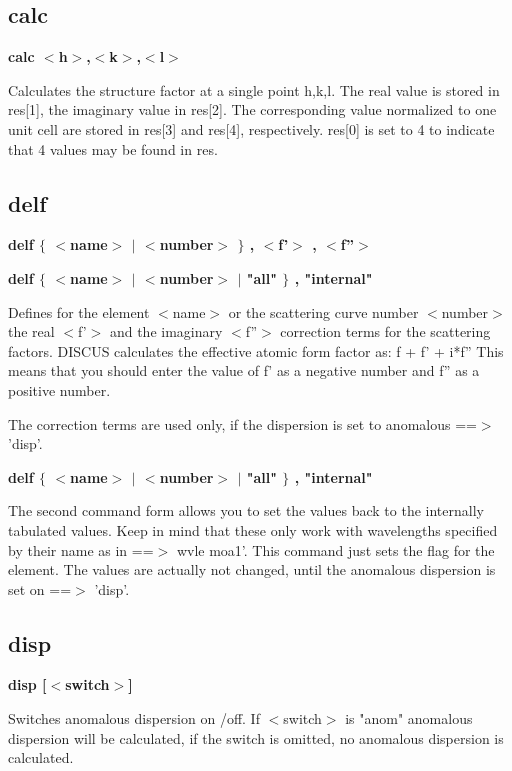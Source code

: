 \subsection*{calc}
{\bf calc $ <$h$> $,$ <$k$> $,$ <$l$> $ \par }
\vspace{3pt}
Calculates the structure factor at a single point h,k,l. 
The real value is stored in res[1], the imaginary value in res[2]. 
The corresponding value normalized to one unit cell are stored in 
res[3] and res[4], respectively. res[0] is set to 4 to indicate 
that 4 values may be found in res. 
\subsection*{delf}
{\bf delf $ \{$ $ <$name$> $ $| $ $ <$number$> $ $\} $ , $ <$f'$> $ , $ <$f''$> $ \par }
{\bf delf $ \{$ $ <$name$> $ $| $ $ <$number$> $ $| $ "all" $\} $ , "internal" \par }
\par
\vspace{3pt}
Defines for the element $ <$name$> $ or the scattering curve number $ <$number$> $ 
the real $ <$f'$> $ and the imaginary $ <$f''$> $ correction terms for the 
scattering factors. 
DISCUS calculates the effective atomic form factor as: 
                f + f' + i*f'' 
This means that you should enter the value of f' as a negative number 
and f'' as a positive number. 
\par
The correction terms are used only, if the dispersion is set to 
anomalous ==$> $ 'disp'. 
\par
{\bf delf $ \{$ $ <$name$> $ $| $ $ <$number$> $ $| $ "all" $\} $ , "internal" \par }
\par
\vspace{3pt}
The second command form allows you to set the values back to the 
internally tabulated values. Keep in mind that these only work with 
wavelengths specified by their name as in ==$> $  wvle moa1'. 
This command just sets the flag for the element. 
The values are actually not changed, until the anomalous dispersion 
is set on ==$> $ 'disp'. 
\subsection*{disp}
{\bf disp [$ <$switch$> $] \par }
\par
\vspace{3pt}
Switches anomalous dispersion on /off. If $ <$switch$> $ is "anom" anomalous 
dispersion will be calculated, if the switch is omitted, no anomalous 
dispersion is calculated. 
